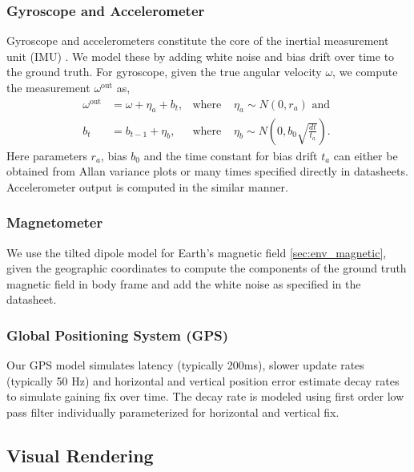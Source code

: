 \documentclass[graybox]{svmult}
\begin{document}
\subsubsection{Gyroscope and Accelerometer}
Gyroscope and accelerometers constitute the core of the inertial measurement unit (IMU) \cite{IMUreport}. We model these by adding white noise and bias drift over time to the ground truth. For gyroscope, given the true angular velocity $\omega$, we compute the measurement $\omega^{\mbox{out}}$ as,
\begin{align*}
\omega^{\mbox{out}} &= \omega + \eta_a + b_t, &\mbox{where } &\eta_a\sim N(0, r_a) \mbox{ and } \\
b_t &= b_{t-1} + \eta_b, &\mbox{where } &\eta_b\sim N \left(0, b_0\sqrt{\frac{dt}{t_a}} \right).
\end{align*}
Here parameters $r_a$, bias $b_0$ and the time constant for bias drift $t_a$ can either be obtained from Allan variance plots or many times specified directly in datasheets. Accelerometer output is computed in the similar manner.

\subsubsection{Magnetometer}
We use the tilted dipole model for Earth's magnetic field \ref{sec:env_magnetic}, given the geographic coordinates to compute the components of the ground truth magnetic field in body frame and add the white noise as specified in the datasheet.

\subsubsection{Global Positioning System (GPS)}
Our GPS model simulates latency (typically 200ms), slower update rates (typically 50 Hz) and horizontal and vertical position error estimate decay rates to simulate gaining fix over time. The decay rate is modeled using first order low pass filter individually parameterized for horizontal and vertical fix.

\subsection{Visual Rendering}
\end{document}
